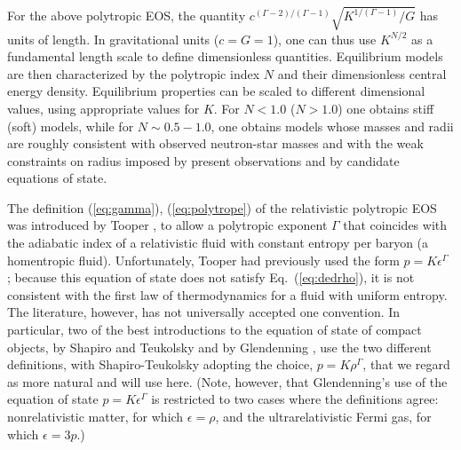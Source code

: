 \documentclass[12pt]{article}
\begin{document}
For the above polytropic EOS, the quantity $c^{(\Gamma-2)/(\Gamma-1)}
\sqrt{K^{1/(\Gamma-1)}/G}$ has units of length. In gravitational units
($c=G=1$), one can thus use $K^{N/2}$ as a fundamental length scale to
define dimensionless quantities. Equilibrium models are then
characterized by the polytropic index $N$ and their dimensionless
central energy density. Equilibrium properties can be scaled to
different dimensional values, using appropriate values for $K$.  For
$N<1.0$ ($N>1.0$) one obtains stiff (soft) models, while for $N\sim 0.5
- 1.0$, one obtains models whose masses and radii are roughly consistent 
with observed neutron-star masses and with the weak constraints on radius 
imposed by present observations and by candidate equations of state.

The definition (\ref{eq:gamma}), (\ref{eq:polytrope}) of the 
relativistic polytropic EOS was introduced by 
Tooper \cite{T65}, to allow a polytropic exponent $\Gamma$
that coincides with the adiabatic index of a relativistic fluid 
with constant entropy per baryon (a homentropic fluid).  
Unfortunately,
Tooper had previously used the form $p=K\epsilon^\Gamma$ \cite{Tooper64}; 
because this equation of state does not satisfy Eq.~(\ref{eq:dedrho}), 
it is not consistent with the first law of 
thermodynamics for a fluid with uniform entropy.  
The literature, however, has not universally accepted one convention.  In 
particular, two of the best introductions to the equation 
of state of compact objects, by Shapiro and Teukolsky \cite{ST83} and 
by Glendenning \cite{Glendenning97}, use the two different definitions, 
with Shapiro-Teukolsky adopting the choice, $p=K\rho^\Gamma$, that we regard 
as more natural and will use here. (Note, however, that Glendenning's  
use of the equation of state $p=K\epsilon^\Gamma$ is 
restricted to two cases where the definitions agree: nonrelativistic matter,
for which $\epsilon=\rho$, and the ultrarelativistic Fermi gas, 
for which $\epsilon = 3p$.)   
    
\vskip0.8cm

 
 
 
 
  

  


\vskip0.8cm
\end{document}
